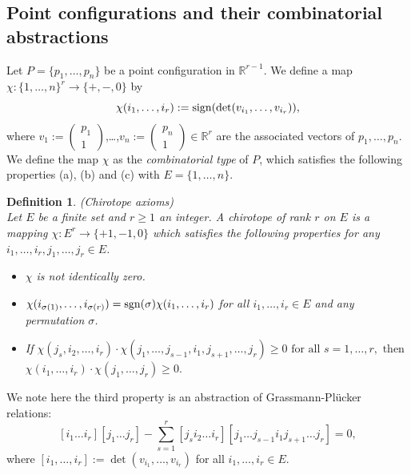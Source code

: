 \documentclass{article}
\newtheorem{defn2}[thm]{\bfseries Definition}
\begin{document}
\subsection{Point configurations and their combinatorial abstractions}
Let $P=\{ p_{1},\dots,p_{n} \}$ be a point configuration in $\mathbb{R}^{r-1}$.
We define a map $\chi : \{ 1,\dots,n\}^{r} \rightarrow \{ +,-,0 \}$ by
\[ \chi (i_{1},\dots,i_{r}) := {\rm sign}(\det (v_{i_{1}},\dots,v_{i_{r}})), \]
where $v_{1}:=\begin{pmatrix}p_{1} \\ 1\end{pmatrix}$,\dots,$v_{n}:=\begin{pmatrix}p_{n} \\ 1\end{pmatrix} \in \mathbb{R}^{r}$ are
the associated vectors of $p_{1},\dots,p_{n}$.
We define the map $\chi$ as the {\it combinatorial type\/} of $P$, which
satisfies the following properties (a), (b) and (c) with $E= \{ 1,\dots,n\}$.
\begin{defn2}(Chirotope axioms)\\
Let $E$ be a finite set and $r\geq 1$  an integer. A {\it chirotope of rank $r$ on $E$} is a mapping 
$\chi : E^{r} \rightarrow \{ +1,-1,0\}$ which satisfies the following properties
for any $i_{1},\dots,i_{r},j_{1},\dots,j_{r} \in E$. 
\begin{itemize}
\item[(a)] $\chi$ is not identically zero.
\item[(b)] $\chi (i_{\sigma (1)},\dots,i_{\sigma (r)}) = {\rm sgn} (\sigma) \chi (i_{1},\dots,i_{r})$
for all $i_1,\dots,i_r \in E$ and any permutation $\sigma$.
\item[(c)] If $\chi (j_{s},i_{2},\dots,i_{r})\cdot \chi (j_{1},\dots,j_{s-1},i_{1},j_{s+1},\dots,j_{r}) \geq 0 \text{ for all } s=1,\dots,r, \text{ then }$\\
$\chi (i_{1},\dots,i_{r}) \cdot \chi (j_{1},\dots,j_{r}) \geq 0.$
\end{itemize}
\label{chirotope_axioms}
\end{defn2} 
We note here the third property is an abstraction of Grassmann-Pl\"ucker relations:
\[ [i_{1}\dots i_{r}][j_{1}\dots j_{r}] - \sum_{s=1}^{r}{[j_{s}i_{2}\dots i_{r}][j_{1}\dots j_{s-1}i_{1}j_{s+1}\dots j_{r}] }= 0,\]
where $[i_{1},\dots,i_{r}]:=\det(v_{i_{1}},\dots,v_{i_{r}})$ for all $i_{1},\dots,i_{r} \in E$.
\end{document}
